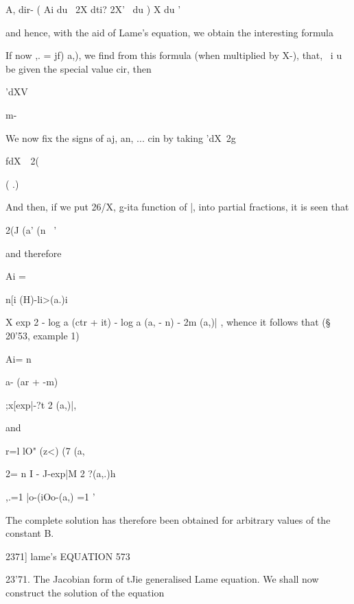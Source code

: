 {{{{{{{{A, dir- ( Ai du \ 2X dti? 2X' \ du ) X du '

and hence, with the aid of Lame's equation, we obtain the interesting
formula

If now ,. = jf) a,), we find from this formula (when multiplied by
X-), that, \ i u be given the special value cir, then



'dXV



m-



We now fix the signs of aj, an, ... cin by taking 'dX\ 2g



fdX\ \ 2(



( .)



And then, if we put 26/X, g-ita function of |, into partial fractions,
it is seen that



2(J (a' (n \ '



and therefore



Ai =



n[i (H)-li>(a.)i



X exp 2 - log a (ctr + it) - log a (a, - n) - 2m (a,)| , whence it
follows that (§ 20'53, example 1)



Ai= n



a- (ar + -m)



;x[exp|-?t 2 (a,)|,



and



r=l lO" (z<) (7 (a,

 2= n I - J-exp|M 2 ?(a,.)h

,.=1 |o-(iOo-(a,) =1 '



The complete solution has therefore been obtained for arbitrary values
of the constant B.



2371] lame's EQUATION 573

23'71. The Jacobian form of tJie generalised Lame equation. We shall
now construct the solution of the equation

}}}}}}}}
